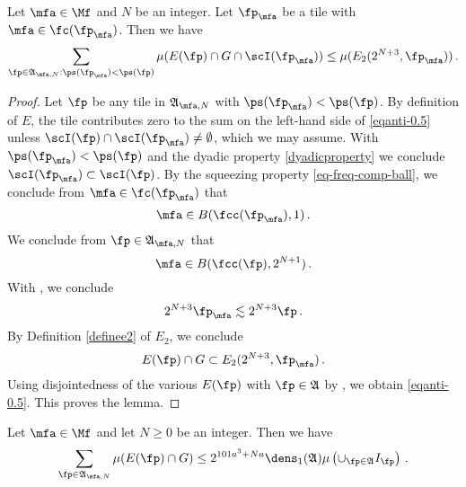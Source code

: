 \begin{lemma}\label{local-antichain-density}
Let $\mfa\in\Mf$ and {$N$} be
an integer. Let $\fp_{\mfa}$ be a tile with $\mfa\in \fc(\fp_{\mfa})$.
Then we have
\begin{equation}\label{eqanti-0.5}
    \sum_{\fp\in\mathfrak{A}_{\mfa,N}: \ps(\fp_{\mfa})<\ps(\fp)}\mu(E(\fp)\cap G \cap \scI(\fp_{\mfa}))
    \le \mu (E_2(2^{N+3},\fp_{\mfa}))
 \, .
\end{equation}



\end{lemma}

\begin{proof}


Let $\fp$ be any tile in $\mathfrak{A}_{\mfa,N}$ with $\ps(\fp_{\mfa})<\ps(\fp)$. By definition of
$E$, the tile contributes zero to the sum on the left-hand side of \eqref{eqanti-0.5} unless
 $\scI(\fp)\cap \scI(\fp_{\mfa}) \neq \emptyset$, which we may assume. With $\ps(\fp_{\mfa})<\ps(\fp)$
and the dyadic property
\eqref{dyadicproperty} we conclude $\scI(\fp_{\mfa})\subset \scI(\fp)$.
By the squeezing property
\eqref{eq-freq-comp-ball},
we conclude from
$\mfa\in \fc(\fp_{\mfa})$
that
\begin{equation}
    \mfa\in B(\fcc(\fp_{\mfa}), 1)\, .
\end{equation}
We conclude from $\fp \in \mathfrak{A}_{\mfa,N}$ that
\begin{equation}
    \mfa \in B(\fcc(\fp), 2^{N+1})\, .
\end{equation}
With , we conclude
\begin{equation}
    2^{N+3}\fp_{\mfa} \lesssim 2^{N+3}\fp \, .
\end{equation}
By Definition \eqref{definee2} of $E_2$, we conclude
\begin{equation}
    E(\fp)\cap G \subset E_2(2^{N+3},\fp_{\mfa})\, .
\end{equation}
Using disjointedness of the various $E(\fp)$ with $\fp\in \mathfrak{A}$ by , we obtain \eqref{eqanti-0.5}.
This proves the lemma.
\end{proof}
\begin{lemma}
\label{global-antichain-density}
Let $\mfa\in\Mf$ and let $N\ge 0$ be
an integer. Then we have
\begin{equation}\label{eqanti00}
    \sum_{\fp\in\mathfrak{A}_{\mfa,N}}\mu(E(\fp)\cap G)
    \le
 2^{101a^3+Na}\dens_1(\mathfrak{A})\mu\left(\cup_{\fp\in\mathfrak{A}}I_{\fp}\right)\, .
\end{equation}
\end{lemma}




